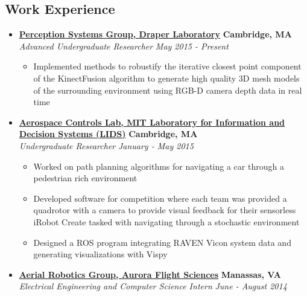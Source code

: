 \documentclass[10pt,letterpaper]{article}
\begin{document}
\subsection*{Work Experience}
  \begin{itemize}
    \parskip=-0.1em

    \item[]
    {\href{http://draper.com/}{\textbf{Perception Systems Group, Draper Laboratory}} \hfill
      \textbf{Cambridge, MA}}
    \\
    {\emph{Advanced Undergraduate Researcher} \hfill \emph{May 2015 - Present}}
	
	\begin{itemize}[label=\textbullet]
	\itemsep0em 
	\item Implemented methods to robustify the iterative closest point component of the KinectFusion algorithm to generate high quality 3D mesh models of the surrounding environment using RGB-D camera depth data in real time
	
\end{itemize}

    \item[]
    {\href{http://acl.mit.edu/}{\textbf{Aerospace Controls Lab, MIT Laboratory for Information and Decision Systems (LIDS)}} \hfill
      \textbf{Cambridge, MA}}
    \\
    {\emph{Undergraduate Researcher} \hfill \emph{January - May 2015}}
	
	\begin{itemize}[label=\textbullet]
	\itemsep0em 
	\item Worked on path planning algorithms for navigating a car through a pedestrian rich environment
	\item Developed software for competition where each team was provided a quadrotor with a camera to provide visual feedback for their sensorless iRobot Create tasked with navigating through a stochastic environment
	\item Designed a ROS program integrating RAVEN Vicon system data and generating visualizations with Vispy
	
\end{itemize}

    \item[]
    {\href{http://aurora.aero}{\textbf{Aerial Robotics Group, Aurora Flight Sciences}} \hfill
      \textbf{Manassas, VA}}
    \\
    {\emph{Electrical Engineering and Computer Science Intern} \hfill \emph{June - August 2014}}
	

\end{itemize}
\end{document}
